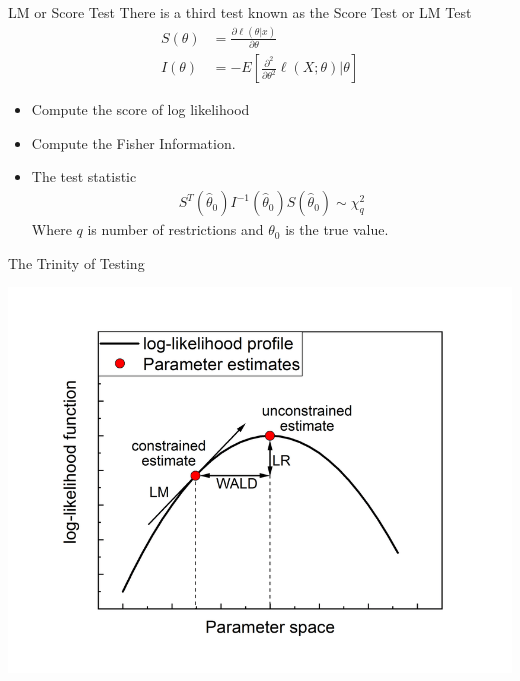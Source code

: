 \documentclass[aspectratio=169]{beamer}
\begin{document}
\begin{frame}{LM or Score Test}
There is a third test known as the \alert{Score Test} or \alert{LM Test}
\begin{align*}
S(\theta)&=\frac{\partial \ell(\theta | x)}{\partial \theta} \\
I(\theta)&=-E\left[\frac{\partial^{2}}{\partial \theta^{2}} \ell(X ; \theta) | \theta\right]
\end{align*}
\begin{itemize}
\item Compute the \alert{score of log likelihood}
\item Compute the \alert{Fisher Information}.
\item The test statistic\
\begin{align*}
S^{T}\left(\hat{\theta}_{0}\right) I^{-1}\left(\hat{\theta}_{0}\right) S\left(\hat{\theta}_{0}\right) \sim \chi_{q}^{2}
\end{align*}
Where $q$ is number of restrictions and $\theta_0$ is the true value.
\end{itemize}
\end{frame}

\begin{frame}{The Trinity of Testing}
\begin{center}
\includegraphics[height=\textheight]{./resources/lmlrwald.png}
\end{center}
\end{frame}
\end{document}
